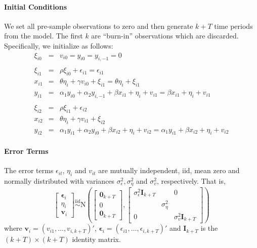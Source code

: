 \documentclass[12pt]{article}
\begin{document}
\paragraph{Initial Conditions} We set all pre-sample observations to zero and then generate $k + T$ time periods from the model. The first $k$ are ``burn-in'' observations which are discarded. Specifically, we initialize as follows:
  \begin{eqnarray*}
    \xi_{i0} &=& v_{i0} = y_{i0} = y_{i,-1} = 0\\ \\
    \xi_{i1} &=& \rho \xi_{i0} + \epsilon_{i1} = \epsilon_{i1}\\
    x_{i1} &=& \theta \eta_i + \gamma v_{i0} + \xi_{i1} = \theta \eta_i + \xi_{i1} \\
    y_{i1} &=& \alpha_1 y_{i0} + \alpha_2 y_{i,-1} + \beta x_{i1} + \eta_i + v_{i1} = \beta x_{i1} + \eta_i + v_{i1}  \\ \\
    \xi_{i2} &=& \rho \xi_{i1} + \epsilon_{i2} \\
    x_{i2} &=& \theta \eta_i + \gamma v_{i1} + \xi_{i2}\\
    y_{i2} &=& \alpha_1 y_{i1} + \alpha_2 y_{i0} + \beta x_{i2} + \eta_i + v_{i2} = \alpha_1 y_{i1} + \beta x_{i2} + \eta_i + v_{i2} 
  \end{eqnarray*}


\paragraph{Error Terms}
The error terms $\epsilon_{it}$, $\eta_i$ and $v_{it}$ are mutually independent, iid, mean zero and normally distributed with variances $\sigma_\epsilon^2, \sigma_\eta^2$ and $\sigma_v^2$, respectively. That is,
  $$\left[ \begin{array}{c} \boldsymbol{\epsilon}_i \\ \eta_i \\ \boldsymbol{v}_i \end{array} \right] \overset{\mbox{iid}}{\sim} \mbox{N}\left(
  \left[ \begin{array}{l}
    \mathbf{0}_{k+T}\\
    0\\
    \mathbf{0}_{k+T}
  \end{array}\right], 
  \left[ \begin{array}{ccc}
    \sigma_\epsilon^2 \mathbf{I}_{k+T}&&0 \\
    &\sigma_\eta^2& \\
    0&&\sigma_v^2 \mathbf{I}_{k+T}
  \end{array}\right]
  \right)$$
where $\mathbf{v}_i = (v_{i1}, \hdots, v_{i,k+T})'$, $\boldsymbol{\epsilon}_i = (\epsilon_{i1}, \hdots, \epsilon_{i,k+T})'$ and $\mathbf{I}_{k+T}$ is the $(k+T)\times(k+T)$ identity matrix.
\end{document}

